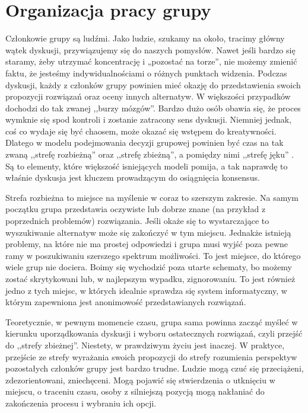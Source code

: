 
\section{Organizacja pracy grupy}
Członkowie grupy są ludźmi. Jako ludzie, szukamy na około, tracimy główny wątek 
dyskusji, przywiązujemy się do naszych pomysłów. Nawet jeśli bardzo się staramy,
żeby utrzymać koncentrację i „pozostać na torze”, nie możemy zmienić faktu, że 
jesteśmy indywidualnościami o różnych punktach widzenia. Podczas dyskusji, 
każdy z członków grupy powinien mieć okazję do przedstawienia swoich propozycji 
rozwiązań oraz oceny innych alternatyw. W większości przypadków dochodzi do tak 
zwanej ,,burzy mózgów''. Bardzo dużo osób obawia się, że proces wymknie się spod
kontroli i zostanie zatracony sens dyskusji. Niemniej jednak, coś co wydaje się 
być chaosem, może okazać się wstępem do kreatywności. Dlatego w modelu 
podejmowania decyzji grupowej powinien być czas na tak zwaną ,,strefę
rozbieżną'' oraz ,,strefę zbieżną'', a pomiędzy nimi ,,strefę jęku''
\cite{Kaner1996}. Są to elementy, które większość isniejących modeli pomija, a
tak naprawdę to właśnie dyskusja jest kluczem prowadzącym do osiągnięcia
konsensus.

Strefa rozbieżna to miejsce na myślenie w coraz to szerszym zakresie. Na samym 
początku grupa przedstawia oczywiste lub dobrze znane (na przykład z 
poprzednich problemów) rozwiązania. Jeśli okaże się to wystarczające to 
wyszukiwanie alternatyw może się zakończyć w tym miejscu. Jednakże istnieją 
problemy, na które nie ma prostej odpowiedzi i grupa musi wyjść poza pewne ramy 
w poszukiwaniu szerszego spektrum możliwości. To jest miejsce, do którego wiele 
grup nie dociera. Boimy się wychodzić poza utarte schematy, bo możemy zostać 
skrytykowani lub, w najlepszym wypadku, zignorowaniu. To jest również jedno z 
tych miejsc, w których idealnie sprawdza się system informatyczny, w którym 
zapewniona jest anonimowość przedstawianych rozwiązań.

Teoretycznie, w pewnym momencie czasu, grupa sama powinna zacząć myśleć w 
kierunku uporządkowania dyskusji i wyboru ostatecznych rozwiązań, czyli  przejść
do ,,strefy zbieżnej''. Niestety, w prawdziwym życiu jest inaczej. W praktyce,
przejście ze strefy wyrażania swoich propozycji do strefy rozumienia perspektyw 
pozostałych członków grupy jest bardzo trudne. Ludzie mogą czuć się przeciążeni,
zdezorientowani, zniechęceni. Mogą pojawić się stwierdzenia o utknięciu w 
miejscu, o traceniu czasu, osoby  z silniejszą pozycją mogą nakłaniać do 
zakończenia procesu i wybraniu ich opcji.

